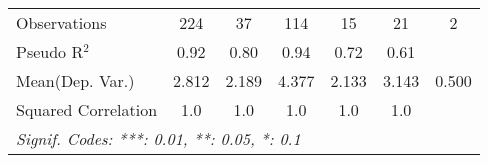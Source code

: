 \begin{tabular}{lcccccc}
   Observations                                            & 224          & 37           & 114           & 15           & 21            & 2\\  
   Pseudo R$^2$                                            & 0.92         & 0.80         & 0.94          & 0.72         & 0.61          & \\  
Mean(Dep. Var.) & 2.812 & 2.189 & 4.377 & 2.133 & 3.143 & 0.500 \\
   Squared Correlation                                     & 1.0          & 1.0          & 1.0           & 1.0          & 1.0           & \\  
   \midrule \midrule
   \multicolumn{7}{l}{\emph{Signif. Codes: ***: 0.01, **: 0.05, *: 0.1}}\\
\end{tabular}
\par\endgroup
